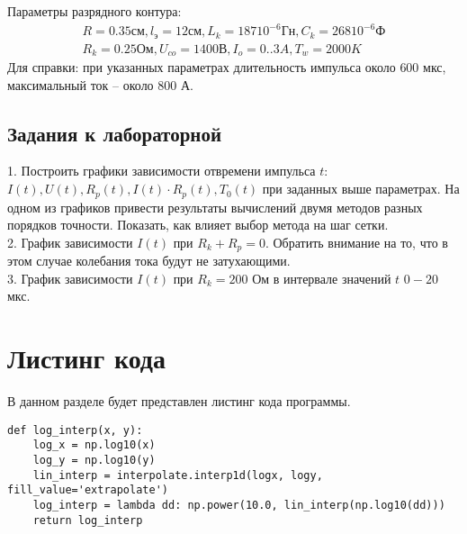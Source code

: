 \newline Параметры разрядного контура:
\begin{eqnarray}
R=0.35 см,l_\text{э}=12 см,L_k=187 10^{-6} Гн,C_k=268 10^{-6} Ф\\ \nonumber
R_k=0.25 Ом,U_{co}=1400 В,I_o=0..3 A,T_w=2000 K
\end{eqnarray}
Для справки:  при указанных параметрах длительность импульса около $600 $ мкс, максимальный ток – около $800 $ А.
\subsection*{Задания к лабораторной}
1. Построить графики зависимости отвремени импульса $t$: $I(t),U(t),R_p(t),I(t)\cdot R_p(t),T_0(t)$ при заданных выше параметрах. На одном из графиков привести результаты вычислений двумя методов разных порядков точности. Показать, как влияет выбор метода на шаг сетки.\\
2. График зависимости $I(t)$ при $R_k+R_p=0$. Обратить внимание на то, что в этом случае колебания тока будут не затухающими.\\
3. График зависимости $I(t)$ при $R_k = 200$ Ом в интервале значений $t$ $0-20$ мкс.

\newpage
\section*{Листинг кода}
В данном разделе будет представлен листинг кода программы.

\begin{lstlisting}[label=some-code,caption= Логарифмическая интерполяция]
def log_interp(x, y):
	log_x = np.log10(x)
	log_y = np.log10(y)
	lin_interp = interpolate.interp1d(logx, logy, fill_value='extrapolate')
	log_interp = lambda dd: np.power(10.0, lin_interp(np.log10(dd)))
	return log_interp

\end{lstlisting}


